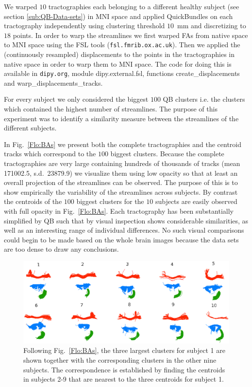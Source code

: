 \documentclass{bioinfo}
\begin{document}
We warped $10$ tractographies each belonging to a different healthy
subject (see section \ref{sub:QB-Data-sets}) in MNI space and applied
QuickBundles on each tractography independently using clustering
threshold $10$~mm and discretizing to $18$ points.  In order to warp the
streamlines we first warped FAs from native space to MNI space using the
FSL tools (\texttt{fsl.fmrib.ox.ac.uk}). Then we applied the (continuously
resampled) displacements to the points in the tractographies in native
space in order to warp them to MNI space. The code for doing this is
available in \texttt{dipy.org}, module dipy.external.fsl, functions
create\_displacements and warp\_displacements\_tracks.

For every subject we
only considered the biggest $100$ QB clusters i.e. the clusters which
contained the highest number of streamlines. The purpose of this
experiment was to identify a similarity measure between the
streamlines of the different subjects.

In Fig.~\ref{Flo:BAs} we present both the complete tractographies and
the centroid tracks which correspond to the $100$ biggest
clusters. Because the complete tractographies are very large containing
hundreds of thousands of tracks (mean \num{171002.5},
s.d.~\num{23879.9}) we visualize them using low opacity so that at least
an overall projection of the streamlines can be observed. The purpose of
this is to show empirically the variability of the streamlines across
subjects. By contrast the centroids of the $100$ biggest clusters for
the $10$ subjects are easily observed with full opacity in
Fig.~\ref{Flo:BAs}. Each tractography has been substantially simplified
by QB such that by visual inspection shows considerable similarities, as
well as an interesting range of individual differences. No such visual
comparisons could begin to be made based on the whole brain images
because the data sets are too dense to draw any conclusions.

\begin{figure}[htp]
  \centerline{\includegraphics[width=180mm]{Figures/Fig_14_correspondences.eps}}
  \caption{Following Fig.~\ref{Flo:BAs}, the three largest clusters for
    subject 1 are shown together with the corresponding clusters in the
    other nine subjects. The correspondence is established by finding
    the centroids in subjects 2-9 that are nearest to the three
    centroids for subject 1. \label{Flo:Corrs}}
\end{figure}
\end{document}
